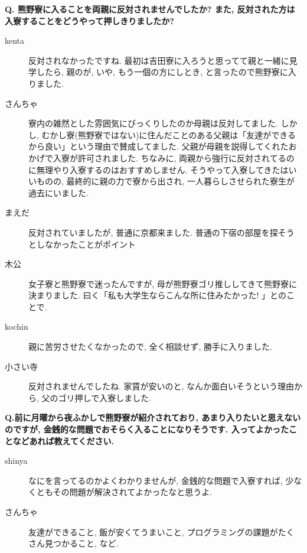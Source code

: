 \documentclass[10pt,b5jsbook,dvips,dvipdfmx,openany]{jsbook}
\theoremstyle{definition}
\begin{document}
		\begin{multicols}{2}
		\begin{tcolorbox}
		\textbf{Q. 熊野寮に入ることを両親に反対されませんでしたか? また, 反対された方は入寮することをどうやって押しきりましたか?}
		\end{tcolorbox}
		\begin{description}
		\item[kenta]反対されなかったですね. 最初は吉田寮に入ろうと思ってて親と一緒に見学したら, 親のが, いや, もう一個の方にしとき, と言ったので熊野寮に入りました.

		\item[さんちゃ]
		寮内の雑然とした雰囲気にびっくりしたのか母親は反対してました. しかし, むかし寮(熊野寮ではない)に住んだことのある父親は「友達ができるから良い」という理由で賛成してました. 父親が母親を説得してくれたおかげで入寮が許可されました. ちなみに, 両親から強行に反対されてるのに無理やり入寮するのはおすすめしません. そうやって入寮してきたはいいものの, 最終的に親の力で寮から出され, 一人暮らしさせられた寮生が過去にいました.

		\item[まえだ]
		反対されていましたが, 普通に京都来ました. 普通の下宿の部屋を探そうとしなかったことがポイント

		\item[木公]
		女子寮と熊野寮で迷ったんですが, 母が熊野寮ゴリ推ししてきて熊野寮に決まりました. 曰く「私も大学生ならこんな所に住みたかった! 」とのことで.

		\item[kochin]
		親に苦労させたくなかったので, 全く相談せず, 勝手に入りました.

		\item[小さい寺]
		反対されませんでしたね. 家賃が安いのと, なんか面白いそうという理由から, 父のゴリ押しで入寮しました.
		\end{description}

		\begin{tcolorbox}
		\textbf{Q.前に月曜から夜ふかしで熊野寮が紹介されており, あまり入りたいと思えないのですが, 金銭的な問題でおそらく入ることになりそうです. 入ってよかったことなどあれば教えてください. }
		\end{tcolorbox}

		\begin{description}
		\item[shinya]
		なにを言ってるのかよくわかりませんが, 金銭的な問題で入寮すれば, 少なくともその問題が解決されてよかったなと思うよ.

		\item[さんちゃ]
		友達ができること, 飯が安くてうまいこと, プログラミングの課題がたくさん見つかること, など.


\end{description}
\end{multicols}
\end{document}

